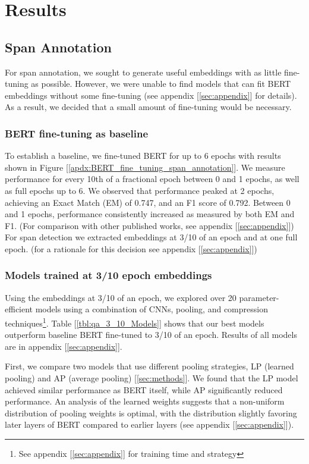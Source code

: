 \section{Results}

\subsection{Span Annotation}
For span annotation, we sought to generate useful embeddings with as little fine-tuning as possible. However, we were unable to find models that can fit BERT embeddings without some fine-tuning (see appendix [\ref{sec:appendix}] for details). As a result, we decided that a small amount of fine-tuning would be necessary.

\subsubsection{BERT fine-tuning as baseline}
To establish a baseline, we fine-tuned BERT for up to 6 epochs with results shown in Figure [\ref{apdx:BERT_fine_tuning_span_annotation}]. We measure performance for every 10th of a fractional epoch between 0 and 1 epochs, as well as full epochs up to 6. We observed that performance peaked at 2 epochs, achieving an Exact Match (EM) of 0.747, and an F1 score of 0.792. Between 0 and 1 epochs, performance consistently increased as measured by  both EM and F1. (For comparison with other published works, see appendix [\ref{sec:appendix}]) For span detection we extracted embeddings at 3/10 of an epoch and at one full epoch. (for a rationale for this decision see appendix [\ref{sec:appendix}])

\subsubsection{Models trained at 3/10 epoch embeddings}
Using the embeddings at 3/10 of an epoch, we explored over 20 parameter-efficient models using a combination of CNNs, pooling, and compression techniques\footnote{See appendix [\ref{sec:appendix}] for training time and strategy}. Table [\ref{tbl:qa_3_10_Models}] shows that our best models outperform baseline BERT fine-tuned to 3/10 of an epoch. Results of all models are in appendix [\ref{sec:appendix}].

First, we compare two models that use different pooling strategies, LP (learned pooling) and AP (average pooling) [\ref{sec:methods}]. We found that the LP model achieved similar performance as BERT itself, while AP significantly reduced performance. An analysis of the learned weights suggests that a non-uniform distribution of pooling weights is optimal, with the distribution slightly favoring later layers of BERT compared to earlier layers (see appendix [\ref{sec:appendix}]).


